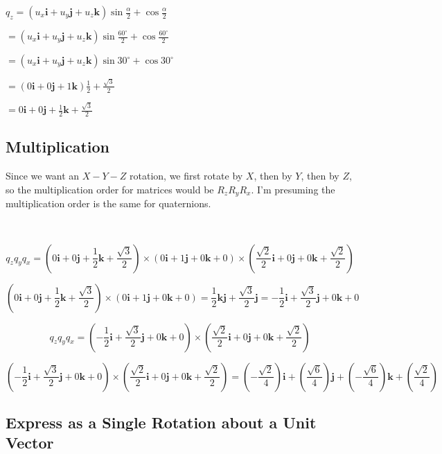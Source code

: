 \documentclass[11pt]{article}
\begin{document}
\begin{spacing}{1.2}
$q_z
 = (u_x \mathbf{i} + u_y \mathbf{j} + u_z \mathbf{k}) \sin \frac{\alpha}{2} + \cos \frac{\alpha}{2}
 $
 
 $ = (u_x \mathbf{i} + u_y \mathbf{j} + u_z \mathbf{k}) \sin \frac{60^{\circ}}{2} + \cos \frac{60^{\circ}}{2}$

 $ = (u_x \mathbf{i} + u_y \mathbf{j} + u_z \mathbf{k}) \sin 30^{\circ} + \cos 30^{\circ}$

 $ = (0 \mathbf{i} + 0\mathbf{j} + 1\mathbf{k}) \frac{1}{2} + \frac{\sqrt3}{2}$

 $ = 0 \mathbf{i} + 0\mathbf{j} + \frac{1}{2}\mathbf{k} + \frac{\sqrt3}{2}$


\subsection{Multiplication}

Since we want an $X-Y-Z$ rotation, we first rotate by $X$, then by $Y$, then by $Z$, so the multiplication order for matrices would be $R_z R_y R_x$.  I'm presuming the multiplication order is the same for quaternions.  

\

$$q_z q_y q_x 
=  
\left(0 \mathbf{i} + 0\mathbf{j} + \frac{1}{2}\mathbf{k} + \frac{\sqrt3}{2}\right)
\times
\left(0 \mathbf{i} + 1\mathbf{j} + 0\mathbf{k} + 0\right)
\times
\left(\frac{\sqrt2}{2}\mathbf{i} + 0\mathbf{j} + 0\mathbf{k}  + \frac{\sqrt2}{2}\right)
$$

$$\left(0 \mathbf{i} + 0\mathbf{j} + \frac{1}{2}\mathbf{k} + \frac{\sqrt3}{2}\right)
\times
\left(0 \mathbf{i} + 1\mathbf{j} + 0\mathbf{k} + 0\right)
 = \frac{1}{2} \mathbf{kj} + \frac{\sqrt3}{2}\mathbf{j}
 = -\frac{1}{2} \mathbf{i} + \frac{\sqrt3}{2}\mathbf{j} + 0 \mathbf{k} + 0
 $$

$$q_z q_y q_x 
=  
\left(-\frac{1}{2} \mathbf{i} + \frac{\sqrt3}{2}\mathbf{j} + 0 \mathbf{k} + 0\right)
\times
\left(\frac{\sqrt2}{2}\mathbf{i} + 0\mathbf{j} + 0\mathbf{k}  + \frac{\sqrt2}{2}\right)
$$

$$
\left(-\frac{1}{2} \mathbf{i} + \frac{\sqrt3}{2}\mathbf{j} + 0 \mathbf{k} + 0\right)
\times
\left(\frac{\sqrt2}{2}\mathbf{i} + 0\mathbf{j} + 0\mathbf{k}  + \frac{\sqrt2}{2}\right)
= \left( -\frac{\sqrt2}{4}\right)\mathbf{i}
+ \left( \frac{\sqrt6}{4}  \right) \mathbf{j}
+ \left(- \frac{\sqrt6}{4} \right) \mathbf{k}
+ \left( \frac{\sqrt2}{4}\right)
$$

\subsection{Express as a Single Rotation about a Unit Vector}


\end{spacing}
\end{document}
